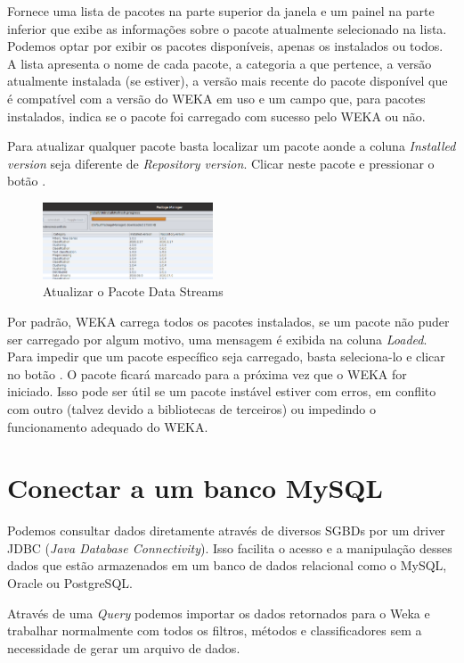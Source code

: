 \documentclass[a4paper,11pt]{article}
\begin{document}
Fornece uma lista de pacotes na parte superior da janela e um painel na parte inferior que exibe as informações sobre o pacote atualmente selecionado na lista. Podemos optar por exibir os pacotes disponíveis, apenas os instalados ou todos. A lista apresenta o nome de cada pacote, a categoria a que pertence, a versão atualmente instalada (se estiver), a versão mais recente do pacote disponível que é compatível com a versão do WEKA em uso e um campo que, para pacotes instalados, indica se o pacote foi carregado com sucesso pelo WEKA ou não.

Para atualizar qualquer pacote basta localizar um pacote aonde a coluna \textit{Installed version} seja diferente de \textit{Repository version}. Clicar neste pacote e pressionar o botão . 

\begin{figure}[H]
	\centering
	\includegraphics[width=0.45\textwidth]{imagem/installPackage.png}
	\caption{Atualizar o Pacote Data Streams}
\end{figure}

Por padrão, WEKA carrega todos os pacotes instalados, se um pacote não puder ser carregado por algum motivo, uma mensagem é exibida na coluna \textit{Loaded}. Para impedir que um pacote específico seja carregado, basta seleciona-lo e clicar no botão . O pacote ficará marcado para a próxima vez que o WEKA for iniciado. Isso pode ser útil se um pacote instável estiver com erros, em conflito com outro (talvez devido a bibliotecas de terceiros) ou impedindo o funcionamento adequado do WEKA.
	
\section{Conectar a um banco MySQL}
Podemos consultar dados diretamente através de diversos SGBDs por um driver JDBC (\textit{Java Database Connectivity}). Isso facilita o acesso e a manipulação desses dados que estão armazenados em um banco de dados relacional como o MySQL, Oracle ou PostgreSQL.

Através de uma \textit{Query} podemos importar os dados retornados para o Weka e trabalhar normalmente com todos os filtros, métodos e classificadores sem a necessidade de gerar um arquivo de dados.
\end{document}
